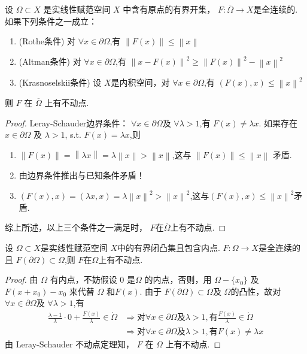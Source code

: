 \documentclass[a4,10pt]{ctexart}
\begin{document}
\begin{tl}{}
  设 $\Omega\subset{X}$ 是实线性赋范空间 $X$ 中含有原点的有界开集， $F:\overline{\Omega}\to{X}$是全连续的. 如果下列条件之一成立：
  \begin{enumerate}
    \item (Rothe条件) 对 $\forall{x}\in\partial\Omega$,有 $\left\|{F(x)}\right\|\le \left\|{x}\right\|$
    \item (Altman条件) 对 $\forall{x}\in \partial\Omega$,有 $\left\|{x-F(x)}\right\|^2\ge \left\|{F(x)}\right\|^2 - \left\|{x}\right\|^2$
    \item (Krasnoselskii条件) 设 $X$是内积空间，对 $\forall{x}\in \partial\Omega$,有 $(F(x),x)\le \left\|{x}\right\|^2$
  \end{enumerate}
  则 $F$ 在 $\overline{\Omega}$ 上有不动点.
\end{tl}
\begin{proof}
  Leray-Schauder边界条件： $\forall{x}\in \partial\Omega$及 $\forall{\lambda}>1$,有 $F(x)\neq{\lambda{x}}$. 如果存在 $x\in \partial\Omega$ 及 $\lambda>1$, s.t. $F(x)=\lambda{x}$,则
  \begin{enumerate}
    \item $\left\|{F(x)}\right\|=\left\|{\lambda{x}}\right\|=\lambda \left\|{x}\right\|>\left\|{x}\right\|$,这与 $\left\|{F(x)}\right\|\le \left\|{x}\right\|$ 矛盾.
    \item 由边界条件推出与已知条件矛盾！
    \item $(F(x),x)=(\lambda{x},x)=\lambda \left\|{x}\right\|^2>\left\|{x}\right\|^2$,这与$(F(x),x)\le \left\|{x}\right\|^2$矛盾.
  \end{enumerate}
  综上所述，以上三个条件之一满足时， $F$在$\overline{\Omega}$上有不动点.
\end{proof}

\begin{tl}{}
  设 $\Omega\subset{X}$是实线性赋范空间 $X$中的有界闭凸集且包含内点. $F:\Omega\to{X}$是全连续的且 $F(\partial\Omega)\subset\Omega$,则 $F$在$\Omega$上有不动点.
\end{tl}
\begin{proof}
  由 $\Omega$ 有内点，不妨假设 $0$ 是$\Omega$ 的内点，否则，用 $\Omega-\{x_0\}$ 及$F(x+x_0)-x_0$ 来代替 $\Omega$ 和$F(x)$. 由于 $F(\partial\Omega)\subset\Omega$及 $\Omega$的凸性，故对$\forall{x}\in \partial\Omega$及 $\forall{\lambda}>1$,有
  \[
  \begin{aligned}
    \frac{\lambda-1}{\lambda}\cdot{0}+\frac{F(x)}{\lambda}\in\dot{\Omega} &\Rightarrow \text{对} \forall{x}\in \partial\Omega \text{及} \lambda>1, \text{有} \frac{F(x)}{\lambda}\in\dot{\Omega}\\
    &\Rightarrow \text{对} \forall{x}\in \partial\Omega\text{及} \lambda>1,\text{有} F(x)\neq{\lambda{x}}  
  \end{aligned}
  \]
  由 Leray-Schauder 不动点定理知， $F$ 在 $\Omega$ 上有不动点.
\end{proof}
\end{document}
